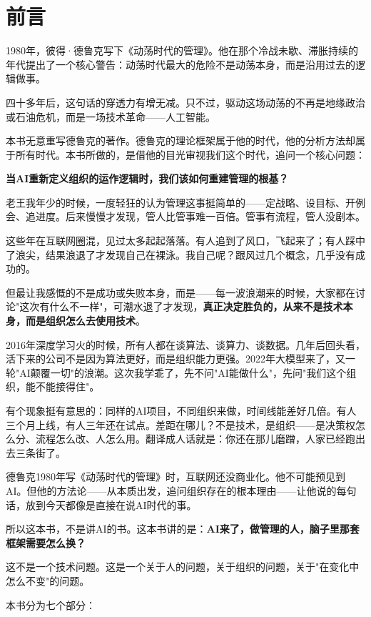 \chapter*{前言}


1980年，彼得·德鲁克写下《动荡时代的管理》。他在那个冷战未歇、滞胀持续的年代提出了一个核心警告：动荡时代最大的危险不是动荡本身，而是沿用过去的逻辑做事。

四十多年后，这句话的穿透力有增无减。只不过，驱动这场动荡的不再是地缘政治或石油危机，而是一场技术革命——人工智能。

本书无意重写德鲁克的著作。德鲁克的理论框架属于他的时代，他的分析方法却属于所有时代。本书所做的，是借他的目光审视我们这个时代，追问一个核心问题：

\textbf{当AI重新定义组织的运作逻辑时，我们该如何重建管理的根基？}

老王我年少的时候，一度轻狂的认为管理这事挺简单的——定战略、设目标、开例会、追进度。后来慢慢才发现，管人比管事难一百倍。管事有流程，管人没剧本。

这些年在互联网圈混，见过太多起起落落。有人追到了风口，飞起来了；有人踩中了浪尖，结果浪退了才发现自己在裸泳。我自己呢？跟风过几个概念，几乎没有成功的。

但最让我感慨的不是成功或失败本身，而是——每一波浪潮来的时候，大家都在讨论"这次有什么不一样"，可潮水退了才发现，\textbf{真正决定胜负的，从来不是技术本身，而是组织怎么去使用技术}。


2016年深度学习火的时候，所有人都在谈算法、谈算力、谈数据。几年后回头看，活下来的公司不是因为算法更好，而是组织能力更强。2022年大模型来了，又一轮"AI颠覆一切"的浪潮。这次我学乖了，先不问"AI能做什么"，先问"我们这个组织，能不能接得住"。

有个现象挺有意思的：同样的AI项目，不同组织来做，时间线能差好几倍。有人三个月上线，有人三年还在试点。差距在哪儿？不是技术，是组织——是决策权怎么分、流程怎么改、人怎么用。翻译成人话就是：你还在那儿磨蹭，人家已经跑出去三条街了。

德鲁克1980年写《动荡时代的管理》时，互联网还没商业化。他不可能预见到AI。但他的方法论——从本质出发，追问组织存在的根本理由——让他说的每句话，放到今天都像是直接在说AI时代的事。

所以这本书，不是讲AI的书。这本书讲的是：\textbf{AI来了，做管理的人，脑子里那套框架需要怎么换？}

这不是一个技术问题。这是一个关于人的问题，关于组织的问题，关于"在变化中怎么不变"的问题。

本书分为七个部分：

